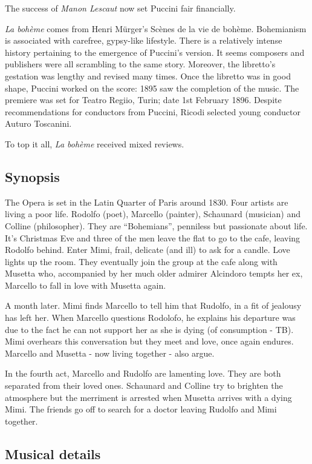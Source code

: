 The success of \textit{Manon Lescaut} now set Puccini fair financially. 

\textit{La boh\`eme} comes from Henri M\"urger's Sc\`enes de la vie de boh\`eme. Bohemianism is associated with carefree, gypsy-like lifestyle. There is a relatively intense history pertaining to the emergence of Puccini's version. It seems composers and publishers were all scrambling to the same story. Moreover, the libretto's gestation was lengthy and revised many times. Once the libretto was in good shape, Puccini worked on the score: 1895 saw the completion of the music. The premiere was set for Teatro Regiio, Turin; date 1st February 1896. Despite recommendations for conductors from Puccini, Ricodi selected young conductor Auturo Toscanini.

To top it all, \textit{La boh\`eme} received mixed reviews. 

\subsection{Synopsis}
The Opera is set in the Latin Quarter of Paris around 1830. Four artists are living a poor life. Rodolfo (poet), Marcello (painter), Schaunard (musician) and Colline (philosopher). They are ``Bohemians'', penniless but passionate about life. It's Christmas Eve and three of the men leave the flat to go to the cafe, leaving Rodolfo behind. Enter Mimi, frail, delicate (and ill) to ask for a candle. Love lights up the room. They eventually join the group at the cafe along with Musetta who, accompanied by her much older admirer Alcindoro tempts her ex, Marcello to fall in love with Musetta again. 

A month later. Mimi finds Marcello to tell him that Rudolfo, in a fit of jealousy has left her. When Marcello questions Rodolofo, he explains his departure was due to the fact he can not support her as she is dying (of consumption - TB). Mimi overhears this conversation but they meet and love, once again endures. Marcello and Musetta - now living together - also argue. 

In the fourth act, Marcello and Rudolfo are lamenting love. They are both separated from their loved ones. Schaunard and Colline try to brighten the atmosphere but the merriment is arrested when Musetta arrives with a dying Mimi. The friends go off to search for a doctor leaving Rudolfo and Mimi together. 

\subsection{Musical details}
  



 




